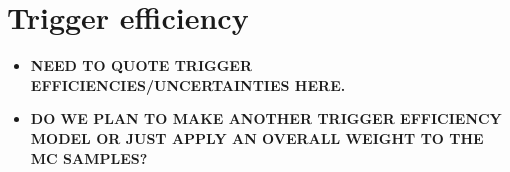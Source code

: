 \section{Trigger efficiency}
\label{sec:trgEff}

\begin{itemize}
\item {\color{red} \bf NEED TO QUOTE TRIGGER EFFICIENCIES/UNCERTAINTIES HERE. }
\item {\color{red} \bf DO WE PLAN TO MAKE ANOTHER TRIGGER EFFICIENCY MODEL OR JUST APPLY AN OVERALL WEIGHT TO THE MC SAMPLES?}
\end{itemize}


